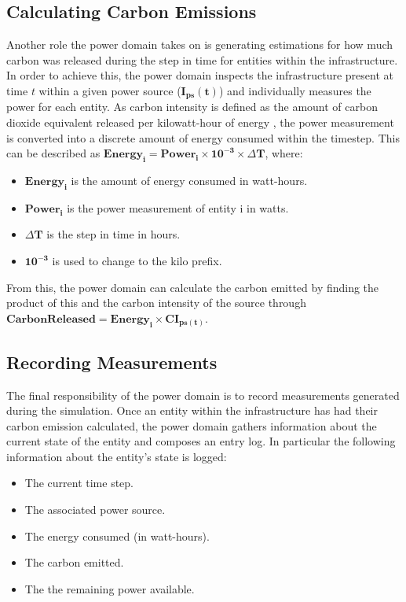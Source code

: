 \documentclass{l4proj}
\begin{document}
\subsection{Calculating Carbon Emissions}\label{subsec:carbon-released}
Another role the power domain takes on is generating estimations for how much carbon was released during the step in time for entities within the infrastructure.
In order to achieve this, the power domain inspects the infrastructure present at time $t$ within a given power source ($\mathbf{I_{ps}(t)}$) and individually measures the power for each entity.
As carbon intensity is defined as the amount of carbon dioxide equivalent released per kilowatt-hour of energy \citep{owid-electricity-mix}, the power measurement is converted into a discrete amount of energy consumed within the timestep.
This can be described as $\mathbf{Energy_{i}} = \mathbf{Power_{i}} \times \mathbf{10^{-3}} \times \mathbf{\varDelta T}$, where:
\begin{itemize}
    \item $\mathbf{Energy_{i}}$ is the amount of energy consumed in watt-hours.
    \item $\mathbf{Power_{i}}$ is the power measurement of entity i in watts.
    \item $\mathbf{\varDelta T}$ is the step in time in hours.
    \item $\mathbf{10^{-3}}$ is used to change to the kilo prefix.
\end{itemize}
From this, the power domain can calculate the carbon emitted by finding the product of this and the carbon intensity of the source through $\mathbf{Carbon Released = Energy_{i} \times CI_{ps(t)}}$.

\subsection{Recording Measurements}\label{subsec:power-domain-recording-measurements}
The final responsibility of the power domain is to record measurements generated during the simulation.
Once an entity within the infrastructure has had their carbon emission calculated, the power domain gathers information about the current state of the entity and composes an entry log.
In particular the following information about the entity's state is logged:
\begin{itemize}
    \item The current time step.
    \item The associated power source.
    \item The energy consumed (in watt-hours).
    \item The carbon emitted.
    \item The the remaining power available.
\end{itemize}
\end{document}
